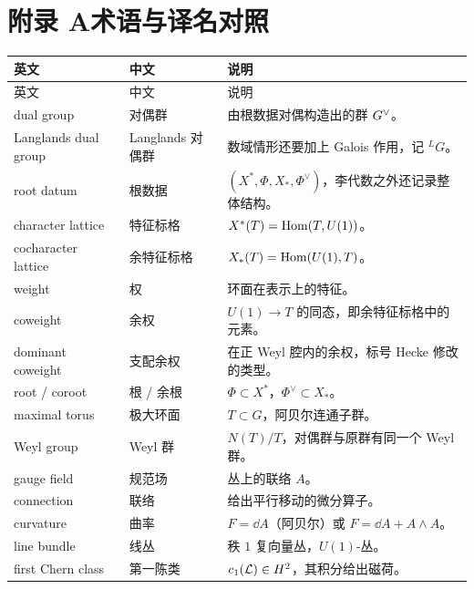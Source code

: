 \clearpage
\section*{附录 A\quad 术语与译名对照}


\vspace{0.6em}
{\small
\begin{longtable}{@{}p{4.3cm}p{3.3cm}p{6.6cm}@{}}
\toprule
英文 & 中文 & 说明 \\
\midrule
\endfirsthead
\toprule
英文 & 中文 & 说明 \\
\midrule
\endhead
\bottomrule
\endfoot
dual group & 对偶群 & 由根数据对偶构造出的群 $G^{\vee}$。 \\
Langlands dual group & Langlands 对偶群 & 数域情形还要加上 Galois 作用，记 ${}^LG$。 \\
root datum & 根数据 & $(X^*,\Phi,X_*,\Phi^\vee)$，李代数之外还记录整体结构。 \\
character lattice & 特征标格 & $X^*(T)=\operatorname{Hom}(T,U(1))$。 \\
cocharacter lattice & 余特征标格 & $X_*(T)=\operatorname{Hom}(U(1),T)$。 \\
weight & 权 & 环面在表示上的特征。 \\
coweight & 余权 & $U(1)\to T$ 的同态，即余特征标格中的元素。 \\
dominant coweight & 支配余权 & 在正 Weyl 腔内的余权，标号 Hecke 修改的类型。 \\
root / coroot & 根 / 余根 & $\Phi\subset X^*$，$\Phi^\vee\subset X_*$。 \\
maximal torus & 极大环面 & $T\subset G$，阿贝尔连通子群。 \\
Weyl group & Weyl 群 & $N(T)/T$，对偶群与原群有同一个 Weyl 群。 \\
gauge field & 规范场 & 丛上的联络 $A$。 \\
connection & 联络 & 给出平行移动的微分算子。 \\
curvature & 曲率 & $F=\dd A$（阿贝尔）或 $F=\dd A+A\wedge A$。 \\
line bundle & 线丛 & 秩 $1$ 复向量丛，$U(1)$-丛。 \\
first Chern class & 第一陈类 & $c_1(\mathcal{L})\in H^2$，其积分给出磁荷。 \\

\end{longtable}}
